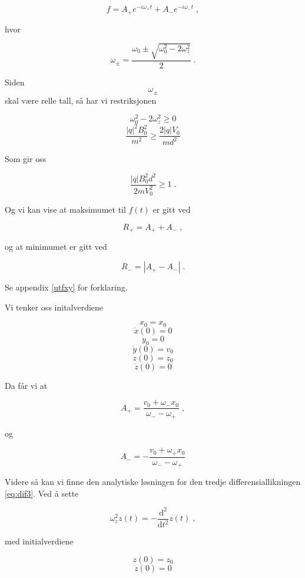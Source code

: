 \documentclass[reprint,english,notitlepage, nofootinbib]{revtex4-1}  %
\begin{document}
\begin{equation}\label{fsolve}
f = A_+e^{-i\omega_+t} + A_-e^{-i\omega_-t} \; ,
\end{equation}

hvor

$$\omega_{\pm} = \frac{\omega_0 \pm \sqrt{\omega_0^2-2\omega_z^2}}{2} \; .$$

Siden $$\omega_{\pm}$$ skal være relle tall, så har vi restriksjonen

$$\omega_0^2-2\omega_z^2 \geq 0$$
$$\frac{|q|^2B_0^2}{m^2} \geq \frac{2|q|V_0}{md^2}$$

Som gir oss

\begin{equation}
\frac{|q|B_0^2d^2}{2mV_0^2} \geq 1 \; .
\end{equation}

Og vi kan vise at maksimumet til $f(t)$ er gitt ved

\begin{equation}\label{fmaks}
R_+ = A_+ + A_- \; ,
\end{equation}

og at minimumet er gitt ved

\begin{equation}\label{fmin}
R_- = \left | A_+ - A_- \right | \; .
\end{equation}

Se appendix \ref{utfxy} for forklaring. 

Vi tenker oss initalverdiene

$$x_0 = x_0$$
$$\dot{x}(0) = 0$$
$$y_0 = 0$$
$$\dot{y}(0) = v_0$$
$$z(0) = z_0$$
$$\dot{z}(0) = 0$$

Da får vi at

\begin{equation}
\label{Aplus}
A_+ = \frac{v_0+\omega_-x_0}{\omega_--\omega_+} \; ,
\end{equation}

og

\begin{equation}
\label{Amin}
A_- = -\frac{v_0+\omega_+x_0}{\omega_--\omega_+}
\end{equation}

Videre så kan vi finne den analytiske løsningen for den tredje differensiallikningen \eqref{eq:dif3}. Ved å sette

$$\omega_z^2z(t) = - \frac{\mathrm{d}^2}{\mathrm{d}t^2}z(t) \; ,$$

med initialverdiene 

$$z(0) = z_0$$
$$\dot{z}(0) = 0$$
\end{document}
